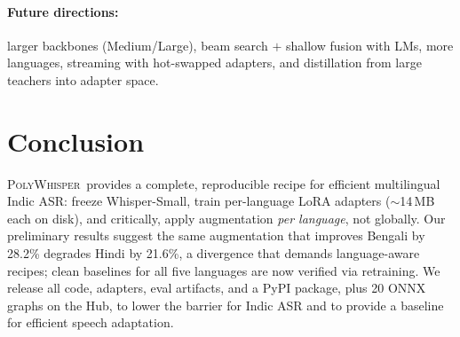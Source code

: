 \documentclass[11pt,a4paper]{article}
\newcommand{\poly}{\textsc{PolyWhisper}}
\begin{document}
\paragraph{Future directions:}
larger backbones (Medium/Large), beam search $+$ shallow fusion with LMs, more languages, streaming with hot-swapped adapters, and distillation from large teachers into adapter space.

\section{Conclusion}

\poly\ provides a complete, reproducible recipe for efficient multilingual
Indic ASR: freeze Whisper-Small, train per-language LoRA adapters
($\sim$14\,MB each on disk), and critically, apply augmentation
\emph{per language}, not globally.
Our preliminary results suggest the same augmentation that improves
Bengali by 28.2\% degrades Hindi by 21.6\%, a divergence that demands
language-aware recipes; clean baselines for all five languages are now
verified via retraining.
We release all code, adapters, eval artifacts, and a PyPI package, plus
20 ONNX graphs on the Hub, to lower the barrier for Indic ASR and to
provide a baseline for efficient speech adaptation.



\end{document}
